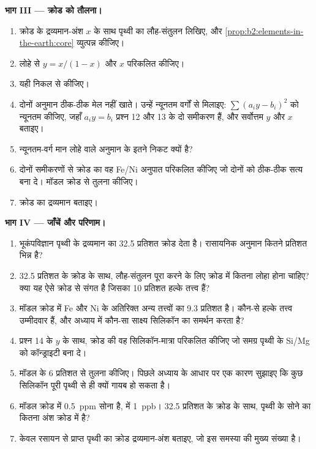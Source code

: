 \begin{problem}
\noindent\textbf{भाग III --- क्रोड को तौलना।}
\begin{enumerate}[resume]
\item क्रोड के द्रव्यमान-अंश $x$ के साथ पृथ्वी का लौह-संतुलन लिखिए, और
\cref{prop:b2:elements-in-the-earth:core} व्युत्पन्न कीजिए।
\item लोहे से $y = x/(1-x)$ और $x$ परिकलित कीजिए।
\item यही निकल से कीजिए।
\item दोनों अनुमान ठीक-ठीक मेल नहीं खाते। उन्हें न्यूनतम वर्गों से मिलाइए:
$\sum (a_iy - b_i)^2$ को न्यूनतम कीजिए, जहाँ $a_i y = b_i$ प्रश्न 12 और 13 के
दो समीकरण हैं, और सर्वोत्तम $y$ और $x$ बताइए।
\item न्यूनतम-वर्ग मान लोहे वाले अनुमान के इतने निकट क्यों है?
\item दोनों समीकरणों से क्रोड का वह Fe/Ni अनुपात परिकलित कीजिए जो
दोनों को ठीक-ठीक सत्य बना दे। मॉडल क्रोड से तुलना कीजिए।
\item क्रोड का द्रव्यमान बताइए।
\end{enumerate}

\noindent\textbf{भाग IV --- जाँचें और परिणाम।}
\begin{enumerate}[resume]
\item भूकंपविज्ञान पृथ्वी के द्रव्यमान का 32.5 प्रतिशत क्रोड देता है। रासायनिक अनुमान
कितने प्रतिशत भिन्न है?
\item 32.5 प्रतिशत के क्रोड के साथ, लौह-संतुलन पूरा करने के लिए क्रोड में कितना लोहा
होना चाहिए? क्या यह ऐसे क्रोड से संगत है जिसका 10 प्रतिशत हल्के
तत्त्व हैं?
\item मॉडल क्रोड में Fe और Ni के अतिरिक्त अन्य तत्त्वों का 9.3 प्रतिशत है। कौन-से
हल्के तत्त्व उम्मीदवार हैं, और अध्याय में कौन-सा साक्ष्य सिलिकॉन का समर्थन करता है?
\item प्रश्न 14 के $y$ के साथ, क्रोड की वह सिलिकॉन-मात्रा परिकलित कीजिए जो
समग्र पृथ्वी के Si/Mg को कॉन्ड्राइटी बना दे।
\item मॉडल के 6 प्रतिशत से तुलना कीजिए। पिछले
अध्याय के आधार पर एक कारण सुझाइए कि कुछ सिलिकॉन पूरी पृथ्वी से ही क्यों गायब हो सकता है।
\item मॉडल क्रोड में \qty{0.5}{ppm} सोना है,  में
\qty{1}{ppb}। 32.5 प्रतिशत के क्रोड के साथ, पृथ्वी के सोने का कितना अंश
क्रोड में है?
\item केवल रसायन से प्राप्त पृथ्वी का क्रोड द्रव्यमान-अंश बताइए,
जो इस समस्या की मुख्य संख्या है।
\end{enumerate}
\end{problem}
